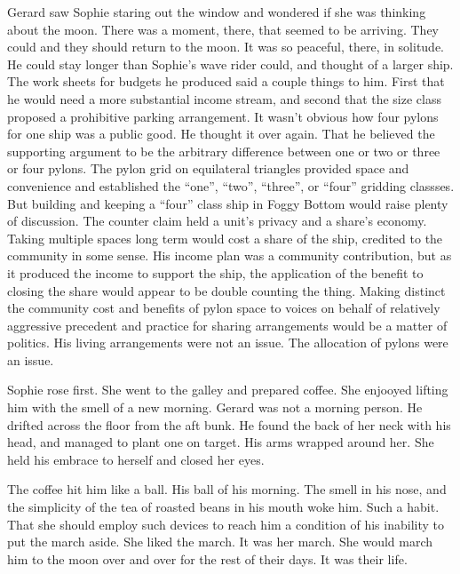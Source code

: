 Gerard saw Sophie staring out the window and wondered if she was
thinking about the moon.  There was a moment, there, that seemed to be
arriving.  They could and they should return to the moon.  It was so
peaceful, there, in solitude.  He could stay longer than Sophie's wave
rider could, and thought of a larger ship.  The work sheets for
budgets he produced said a couple things to him.  First that he would
need a more substantial income stream, and second that the size class
proposed a prohibitive parking arrangement.  It wasn't obvious how
four pylons for one ship was a public good.  He thought it over again.
That he believed the supporting argument to be the arbitrary
difference between one or two or three or four pylons.  The pylon grid
on equilateral triangles provided space and convenience and
established the ``one'', ``two'', ``three'', or ``four'' gridding
classses.  But building and keeping a ``four'' class ship in Foggy
Bottom would raise plenty of discussion.  The counter claim held a
unit's privacy and a share's economy.  Taking multiple spaces long
term would cost a share of the ship, credited to the community in some
sense.  His income plan was a community contribution, but as it
produced the income to support the ship, the application of the
benefit to closing the share would appear to be double counting the
thing.  Making distinct the community cost and benefits of pylon space
to voices on behalf of relatively aggressive precedent and practice
for sharing arrangements would be a matter of politics.  His living
arrangements were not an issue.  The allocation of pylons were an
issue.



Sophie rose first.  She went to the galley and prepared coffee.  She
enjooyed lifting him with the smell of a new morning.  Gerard was not
a morning person.  He drifted across the floor from the aft bunk.  He
found the back of her neck with his head, and managed to plant one on
target.  His arms wrapped around her.  She held his embrace to herself
and closed her eyes.





The coffee hit him like a ball.  His ball of his morning.  The smell
in his nose, and the simplicity of the tea of roasted beans in his
mouth woke him.  Such a habit.  That she should employ such devices to
reach him a condition of his inability to put the march aside.  She
liked the march.  It was her march.  She would march him to the moon
over and over for the rest of their days.  It was their life.

